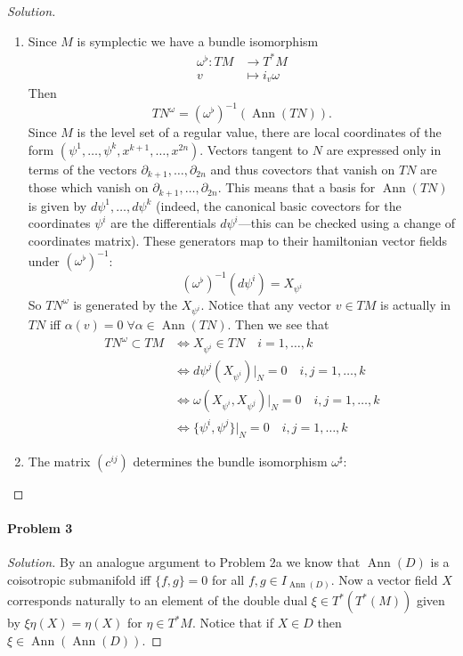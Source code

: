 \begin{proof}[Solution]\leavevmode
	\begin{enumerate}[label=\alph*.]
		\item Since $M$ is symplectic we have a bundle isomorphism
\begin{align*}
	\omega^\flat: TM &\longrightarrow T^*M \\
	v &\longmapsto i_v\omega
\end{align*}
Then 
\[T N^\omega=(\omega^\flat )^{-1}(\operatorname{Ann}(T N)).\]
Since $M$ is the level set of a regular value, there are local coordinates of the form $(\psi^1,\ldots,\psi^k,x^{k+1},\ldots,x^{2n})$. Vectors tangent to $N$ are expressed only in terms of the vectors $\partial_{k+1},\ldots,\partial_{2n}$ and thus covectors that vanish on $T N$ are those which vanish on $\partial_{k+1},\ldots, \partial_{2n}$. This means that a basis for $\operatorname{Ann}(T N)$ is given by $d\psi^1,\ldots,d\psi^k$ (indeed, the canonical basic covectors for the coordinates $\psi^i$ are the differentials $d\psi^i$---this can be checked using a change of coordinates matrix). These generators map to their hamiltonian vector fields under $(\omega^\flat)^{-1}$:
\[\left(\omega^\flat \right)^{-1}(d\psi^i)=X_{\psi^i}\]
So $T N^\omega$ is generated by the $X_{\psi^i}$. Notice that any vector $v \in TM$ is actually in $T N$ iff $\alpha(v)=0\;\forall \alpha\in\operatorname{Ann}(T N) $. Then we see that
\begin{align*}
	T N^\omega\subset TM&\iff X_{\psi^i}\in T N\quad i=1,\ldots,k\\
	&\iff d\psi^j(X_{\psi^i})|_{N}=0 \quad i,j=1,\ldots,k\\
	&\iff \omega(X_{\psi^i},X_{\psi^j})|_{N}=0\quad i,j=1,\ldots,k\\
	&\iff \{\psi^i,\psi^j\}|_{N}=0\quad i,j=1,\ldots,k
\end{align*}

\item The matrix $(c^{ij})$ determines the bundle isomorphism $\omega^\sharp:$
	\end{enumerate}
\end{proof}

\paragraph{Problem 3}

\begin{proof}[Solution]\leavevmode
	By an analogue argument to Problem 2a we know that $\operatorname{Ann}(D)$ is a coisotropic submanifold iff $\{f,g\} =0$ for all $f,g\in I_{\operatorname{Ann}(D)}$. Now a vector field $X$ corresponds naturally to an element of the double dual $\xi \in T^*(T^*(M))$ given by $\xi\eta(X)=\eta(X)$ for  $\eta\in T^*M$. Notice that if $X \in D$ then $\xi \in \operatorname{Ann}(\operatorname{Ann}(D) ) $.
\end{proof}


